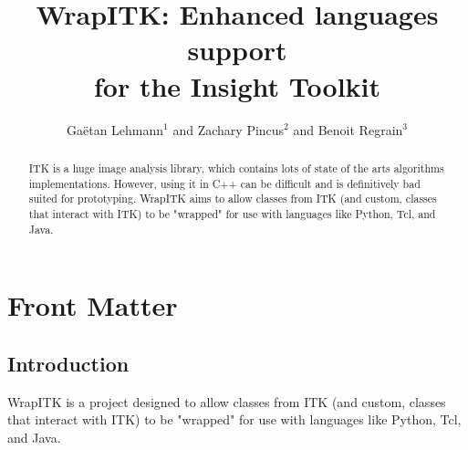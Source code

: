 \documentclass{InsightArticle}
\title{WrapITK: Enhanced languages support\\ for the Insight Toolkit}
\author{Ga\"etan Lehmann{$^1$} {\small{and}} Zachary Pincus{$^2$} {\small{and}} Benoit Regrain{$^3$}}
\begin{document}
\lstset{language=python}
\maketitle

\ifhtml
\chapter*{Front Matter\label{front}}
\fi


\begin{abstract}
\noindent
ITK is a huge image analysis library, which contains lots of state of the arts
algorithms implementations. However, using it in C++ can be difficult and is
definitively bad suited for prototyping. WrapITK aims to allow classes from ITK
(and custom, classes that interact with ITK) to be "wrapped" for use with
languages like Python, Tcl, and Java.
\end{abstract}

\tableofcontents

\section{Introduction}

WrapITK is a project designed to allow classes from ITK (and custom, classes
that interact with ITK) to be "wrapped" for use with languages like
Python, Tcl, and Java.
\end{document}
